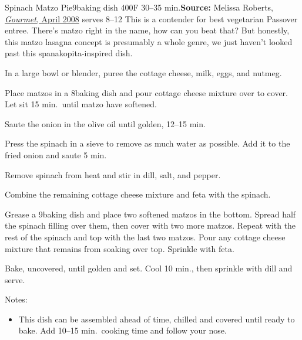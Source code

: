 \begin{recipe}{Spinach Matzo Pie}{9\inch{}\inch baking dish \hfill 400\0F \hfill 30--35 min.}{\textbf{Source:} Melissa Roberts, \href{https://www.epicurious.com/recipes/food/views/spinach-and-matzoh-pie-242019}{\textit{Gourmet}, April 2008} \hfill serves 8--12}
 \freeform This is a contender for best vegetarian Passover entree. There's matzo right in the name, how can you beat that? But honestly, this matzo lasagna concept is presumably a whole genre, we just haven't looked past this spanakopita-inspired dish.

 In a large bowl or blender, puree the cottage cheese, milk, eggs, and nutmeg.

 Place matzos in a 8\inch{}\inch baking dish and pour cottage cheese mixture over to cover. Let sit 15 min.\ until matzo have softened.

 Saute the onion in the olive oil until golden, 12--15 min.

 Press the spinach in a sieve to remove as much water as possible. Add it to the fried onion and saute 5 min.

 Remove spinach from heat and stir in dill, salt, and pepper.

 Combine the remaining cottage cheese mixture and feta with the spinach.

 Grease a 9\inch{}\inch baking dish and place two softened matzos in the bottom. Spread half the spinach filling over them, then cover with two more matzos. Repeat with the rest of the spinach and top with the last two matzos. Pour any cottage cheese mixture that remains from soaking over top. Sprinkle with feta.

 Bake, uncovered, until golden and set. Cool 10 min., then sprinkle with dill and serve.

 \freeform Notes:
 \begin{itemize}
  \item This dish can be assembled ahead of time, chilled and covered until ready to bake. Add 10--15 min.\ cooking time and follow your nose.
 \end{itemize}
\end{recipe}

